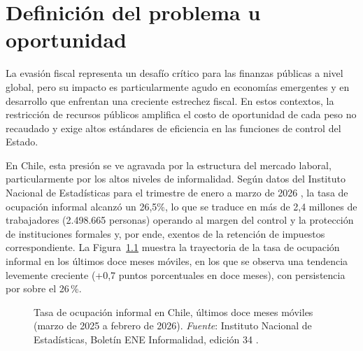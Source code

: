 \chapter{Definición del problema u oportunidad} %
\label{sec:problema} %

La evasión fiscal representa un desafío crítico para las finanzas públicas a nivel global, pero su impacto es particularmente agudo en economías emergentes y en desarrollo que enfrentan una creciente estrechez fiscal. En estos contextos, la restricción de recursos públicos amplifica el costo de oportunidad de cada peso no recaudado y exige altos estándares de eficiencia en las funciones de control del Estado.

En Chile, esta presión se ve agravada por la estructura del mercado laboral, particularmente por los altos niveles de informalidad. Según datos del Instituto Nacional de Estadísticas para el trimestre de enero a marzo de 2026 \parencite{ine2026ene}, la tasa de ocupación informal alcanzó un 26{,}5\%, lo que se traduce en más de 2{,}4 millones de trabajadores (2.498.665 personas) operando al margen del control y la protección de instituciones formales y, por ende, exentos de la retención de impuestos correspondiente. La Figura~\ref{fig:ine-informalidad} muestra la trayectoria de la tasa de ocupación informal en los últimos doce meses móviles, en los que se observa una tendencia levemente creciente (+0,7 puntos porcentuales en doce meses), con persistencia por sobre el 26\,\%.

\begin{figure}[ht]
  \centering
  \caption{Tasa de ocupaci\'on informal en Chile, \'ultimos doce meses m\'oviles (marzo de 2025 a febrero de 2026). \emph{Fuente}: Instituto Nacional de Estad\'isticas, Bolet\'in ENE Informalidad, edici\'on 34 \parencite{ine2026ene}.}
  \label{fig:ine-informalidad}
\end{figure}

